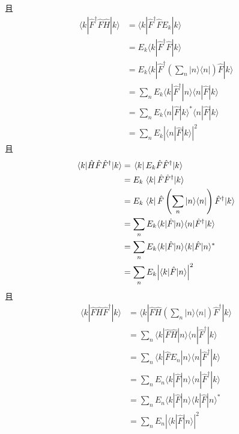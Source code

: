 且
\begin{equation}
    \begin{aligned}
        \langle k|\hat{F}^{\dagger}\hat{F}\hat{H}|k\rangle &=\langle k|\hat{F}^{\dagger}\hat{F}E_k|k\rangle 
\\
&=E_k\langle k|\hat{F}^{\dagger}\hat{F}|k\rangle 
\\
&=E_k\langle k|\hat{F}^{\dagger}\left( \sum_n{|n\rangle \langle n|} \right) \hat{F}|k\rangle 
\\
&=\sum_n{E_k\langle k|\hat{F}^{\dagger}|n\rangle \langle n|\hat{F}|k\rangle}
\\
&=\sum_n{E_k\langle n|\hat{F}|k\rangle ^*\langle n|\hat{F}|k\rangle}
\\
&=\sum_n{E_k\left| \langle n|\hat{F}|k\rangle \right|^2}
    \end{aligned}
\end{equation}
且
\begin{equation}
    \begin{aligned}
        \langle k|\hat{H}\hat{F}\hat{F}^{\dagger}|k\rangle &=\left. \langle k \right|E_k\hat{F}\hat{F}^{\dagger}|k\rangle 
\\
&=E_k\left. \langle k \right|\hat{F}\hat{F}^{\dagger}|k\rangle 
\\
&=E_k\left. \langle k \right|\hat{F}\left( \sum_n{|n\rangle \langle n|} \right) \hat{F}^{\dagger}|k\rangle 
\\
&=\sum_n{E_k\langle k|\hat{F}|n\rangle \langle n|\hat{F}^{\dagger}|k\rangle}
\\
&=\sum_n{E_k\langle k|\hat{F}|n\rangle \langle k|\hat{F}|n\rangle ^*}
\\
&=\sum_n{E_k\Bigl| \langle k|\hat{F}|n\rangle \Bigr| ^2}
    \end{aligned}
\end{equation}
且
\begin{equation}
    \begin{aligned}
        \langle k|\hat{F}\hat{H}\hat{F}^{\dagger}|k\rangle &=\langle k|\hat{F}\hat{H}\left( \sum_n{|n\rangle \langle n|} \right) \hat{F}^{\dagger}|k\rangle 
\\
&=\sum_n{\langle k|\hat{F}\hat{H}|n\rangle \langle n|\hat{F}^{\dagger}|k\rangle}
\\
&=\sum_n{\langle k|\hat{F}E_n|n\rangle \langle n|\hat{F}^{\dagger}|k\rangle}
\\
&=\sum_n{E_n\langle k|\hat{F}|n\rangle \langle n|\hat{F}^{\dagger}|k\rangle}
\\
&=\sum_n{E_n\langle k|\hat{F}|n\rangle \langle k|\hat{F}|n\rangle ^*}
\\
&=\sum_n{E_n\left| \langle k|\hat{F}|n\rangle \right|^2}
    \end{aligned}
\end{equation}
